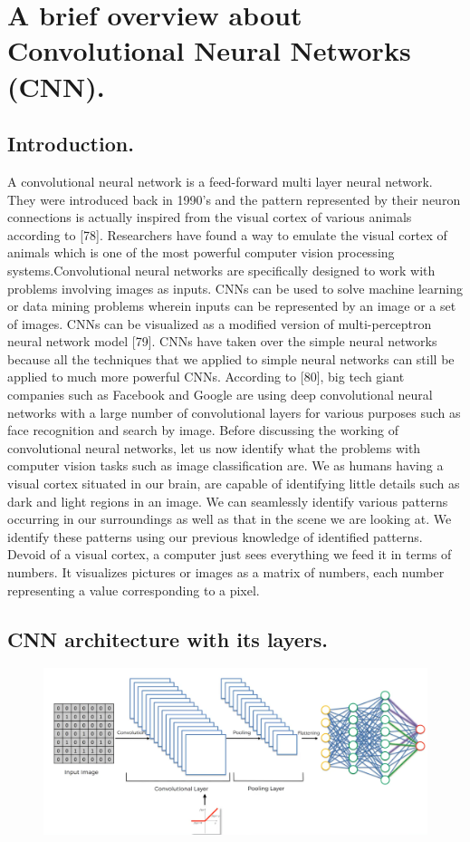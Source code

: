 \documentclass[11pt]{report}
\begin{document}
\section{A brief overview about Convolutional Neural Networks (CNN).}

\subsection{Introduction.}
A convolutional neural network is a feed-forward multi layer neural network. They were introduced back in
1990’s and the pattern represented by their neuron connections is actually inspired from the visual cortex of
various animals according to [78]. Researchers have found a way to emulate the visual cortex of animals which is
one of the most powerful computer vision processing systems.Convolutional neural networks are specifically
designed to work with problems involving images as inputs. CNNs can be used to solve machine learning or
data mining problems wherein inputs can be represented by an image or a set of images. CNNs can be
visualized as a modified version of multi-perceptron neural network model [79]. CNNs have taken over the
simple neural networks because all the techniques that we applied to simple neural networks can still be applied
to much more powerful CNNs. According to [80], big tech giant companies such as Facebook and Google are
using deep convolutional neural networks with a large number of convolutional layers for various purposes such
as face recognition and search by image. Before discussing the working of convolutional neural networks, let us
now identify what the problems with computer vision tasks such as image classification are. We as humans
having a visual cortex situated in our brain, are capable of identifying little details such as dark and light regions
in an image. We can seamlessly identify various patterns occurring in our surroundings as well as that in the
scene we are looking at. We identify these patterns using our previous knowledge of identified patterns. Devoid
of a visual cortex, a computer just sees everything we feed it in terms of numbers. It visualizes pictures or
images as a matrix of numbers, each number representing a value corresponding to a pixel.\\

\subsection{CNN architecture with its layers.}
\begin{figure}[h]
	\centerline{\small 
		\includegraphics[height=0.25\textheight]  {CNN}}
\end{figure}
\end{document}
